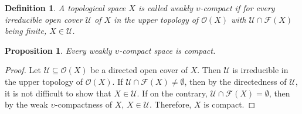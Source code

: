 \documentclass[preprint,12pt]{elsarticle}
\numberwithin{equation}{section}
\newtheorem{proposition}[theorem]{Proposition}
\newtheorem{definition}[theorem]{Definition}
\begin{document}
\begin{definition}A topological space $X$ is called weakly $\upsilon$-compact if for every irreducible open cover $\mathcal{U}$ of $X$ in the upper topology of $\mathcal{O}(X)$ with $\mathcal{U}\cap\mathscr{F}(X)$ being finite, $X\in\mathcal{U}$.
\end{definition}

\begin{proposition} Every weakly $\upsilon$-compact space is compact.
\end{proposition}

\begin{proof}Let $\mathcal{U}\subseteq\mathcal{O}(X)$ be a directed open cover of $X$. Then $\mathcal{U}$ is irreducible in the upper topology of $\mathcal{O}(X)$. If $\mathcal{U}\cap\mathscr{F}(X)\neq\emptyset$, then by the directedness of $\mathcal{U}$,  it is not difficult to show that $X\in\mathcal{U}$. If on the contrary, $\mathcal{U}\cap\mathscr{F}(X)=\emptyset$, then by the weak $\upsilon$-compactness of $X$, $X\in\mathcal{U}$. Therefore, $X$ is compact.\end{proof}
\end{document}
